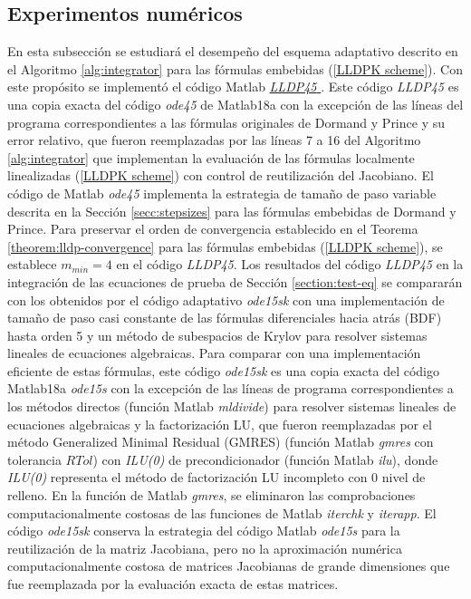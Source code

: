 \subsection{Experimentos numéricos}\label{section:num-exp-lldp-var-step}
En esta subsección se estudiará el desempeño del esquema adaptativo descrito en el Algoritmo \ref{alg:integrator} para las fórmulas embebidas (\ref{LLDPK scheme}). Con este propósito se implementó el código Matlab \href{https://github.com/fsadannn/JF-LLDPschemes}{{\emph{LLDP45} \faExternalLink}}. Este código \emph{LLDP45} es una copia exacta del código \emph{ode45} \cite{shampine1997matlab} de Matlab18a con la excepción de las líneas del programa correspondientes a las fórmulas originales de Dormand y Prince y su error relativo, que fueron reemplazadas por las líneas 7 a 16 del Algoritmo \ref{alg:integrator} que implementan la evaluación de las fórmulas localmente linealizadas (\ref{LLDPK scheme}) con control de reutilización del Jacobiano. El código de Matlab \emph{ode45} implementa la estrategia de tamaño de paso variable descrita en la Sección \ref{secc:stepsizes} para las fórmulas embebidas de Dormand y Prince. Para preservar el orden de convergencia establecido en el Teorema \ref{theorem:lldp-convergence} para las fórmulas embebidas (\ref{LLDPK scheme}), se establece $m_{min}=4$ en el código \emph{LLDP45}.
Los resultados del código \emph{LLDP45} en la integración de las ecuaciones de prueba de Sección \ref{section:test-eq} se compararán con los obtenidos por el código adaptativo \emph{ode15sk} con una implementación de tamaño de paso casi constante de las fórmulas diferenciales hacia atrás (BDF) hasta orden 5 y un método de subespacios de Krylov para resolver sistemas lineales de ecuaciones algebraicas. Para comparar con una implementación eficiente de estas fórmulas, este código \emph{ode15sk} es una copia exacta del código Matlab18a \emph{ode15s} \cite{shampine1997matlab} con la excepción de las líneas de programa correspondientes a los métodos directos (función Matlab \emph{mldivide}) para resolver sistemas lineales de ecuaciones algebraicas y la factorización LU, que fueron reemplazadas por el método Generalized Minimal Residual (GMRES) (función Matlab \emph{gmres} con tolerancia $RTol$) con \emph{ILU(0)} de precondicionador (función Matlab \emph{ilu}), donde \emph{ILU(0)} representa el método de factorización LU incompleto con 0 nivel de relleno. En la función de Matlab \emph{gmres}, se eliminaron las comprobaciones computacionalmente costosas de las funciones de Matlab \emph{iterchk} y \emph{iterapp}. El código \emph{ode15sk} conserva la estrategia del código Matlab \emph{ode15s} para la reutilización de la matriz Jacobiana, pero no la aproximación numérica computacionalmente costosa de matrices Jacobianas de grande dimensiones que fue reemplazada por la evaluación exacta de estas matrices.
